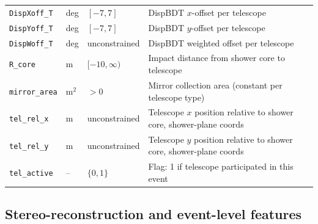 \documentclass[12pt]{article}
\begin{document}
\begin{longtable}{lll p{5.5cm}}
\texttt{DispXoff\_T} & deg & $[-7,7]$ & DispBDT $x$-offset per telescope \\
\texttt{DispYoff\_T} & deg & $[-7,7]$ & DispBDT $y$-offset per telescope \\
\texttt{DispWoff\_T} & deg & unconstrained & DispBDT weighted offset per telescope \\
\texttt{R\_core} & m & $[-10,\infty)$ & Impact distance from shower core to telescope \\
\texttt{mirror\_area} & m$^2$ & $>0$ & Mirror collection area (constant per telescope type) \\
\texttt{tel\_rel\_x} & m & unconstrained & Telescope $x$ position relative to shower core, shower-plane coords \\
\texttt{tel\_rel\_y} & m & unconstrained & Telescope $y$ position relative to shower core, shower-plane coords \\
\texttt{tel\_active} & -- & $\{0,1\}$ & Flag: 1 if telescope participated in this event \\
\end{longtable}

\subsection{Stereo-reconstruction and event-level features}
\end{document}
